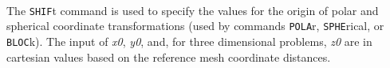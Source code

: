  \\{\smallskip}
\headb

The {\tt SHIF}t command is used to specify the values for the
origin of polar and spherical coordinate transformations
(used by commands {\tt POLA}r, {\tt SPHE}rical, or {\tt BLOC}k).
The input of {\it x0}, {\it y0}, and, for three dimensional problems, {\it z0}
are in cartesian values based on the reference mesh coordinate distances.
\vfil\eject
